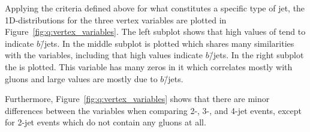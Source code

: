 Applying the criteria defined above for what constitutes a specific type of jet, the 1D-distributions for the three vertex variables are plotted in Figure~\ref{fig:q:vertex_variables}. 
The left subplot shows that high values of  tend to indicate $b$\=/jets. 
In the middle subplot  is plotted which shares many similarities with the  variables, including that high values indicate $b$\=/jets. In the right subplot the  is plotted. This variable has many zeros in it which correlates mostly with gluons and large values are mostly due to $b$\=/jets. 

Furthermore, Figure~\ref{fig:q:vertex_variables} shows that there are minor differences between the variables when comparing 2-, 3-, and 4-jet events, except for 2-jet events which do not contain any gluons at all. 


